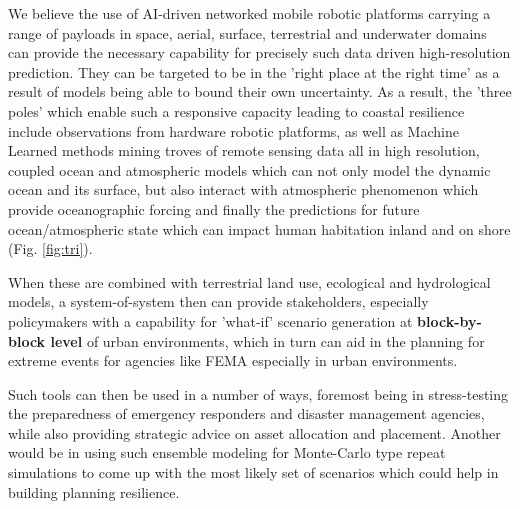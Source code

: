 We believe the use of AI-driven networked mobile robotic platforms
carrying a range of payloads in space, aerial, surface, terrestrial
and underwater domains can provide the necessary capability for
precisely such data driven high-resolution prediction. They can be
targeted to be in the 'right place at the right time' as a result of
models being able to bound their own uncertainty. As a result, the
'three poles' which enable such a responsive capacity leading to
coastal resilience include observations from hardware robotic
platforms, as well as Machine Learned methods mining troves of remote
sensing data all in high resolution, coupled ocean and atmospheric
models which can not only model the dynamic ocean and its surface, but
also interact with atmospheric phenomenon which provide oceanographic
forcing and finally the predictions for future ocean/atmospheric state
which can impact human habitation inland and on shore
(Fig. \ref{fig:tri}).

When these are combined with terrestrial land use, ecological and
hydrological models, a system-of-system then can provide stakeholders,
especially policymakers with a capability for 'what-if' scenario
generation at \textbf{block-by-block level} of urban environments,
which in turn can aid in the planning for extreme events for agencies
like FEMA especially in urban environments. 

Such tools can then be used in a number of ways, foremost being in
stress-testing the preparedness of emergency responders and disaster
management agencies, while also providing strategic advice on asset
allocation and placement. Another would be in using such ensemble
modeling for Monte-Carlo type repeat simulations to come up with the
most likely set of scenarios which could help in building planning
resilience.
